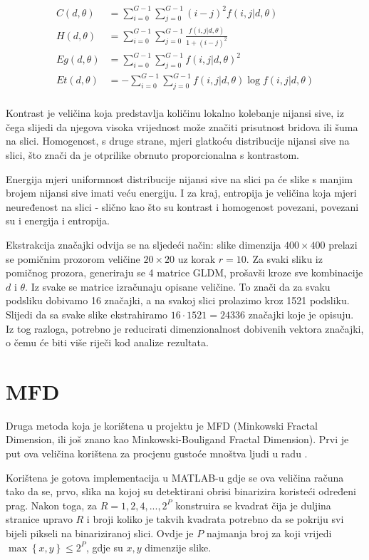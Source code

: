 \documentclass{report}
\begin{document}
\begin{align*}
C(d, \theta) &= \sum_{i=0}^{G-1}\sum_{j=0}^{G-1}(i-j)^2f(i,j|d, \theta)\\
H(d, \theta) &= \sum_{i=0}^{G-1}\sum_{j=0}^{G-1}\frac{f(i,j|d, \theta)}{1 + (i-j)^2}\\
Eg(d, \theta) &= \sum_{i=0}^{G-1}\sum_{j=0}^{G-1}f(i,j|d, \theta)^2\\
Et(d, \theta) &= -\sum_{i=0}^{G-1}\sum_{j=0}^{G-1}f(i,j|d, \theta)\log f(i, j |d, \theta)\\
\end{align*}

Kontrast je veličina koja predstavlja količinu lokalno kolebanje nijansi sive, iz čega slijedi da njegova visoka vrijednost može značiti prisutnost bridova ili šuma na slici. Homogenost, s druge strane, mjeri glatkoću distribucije nijansi sive na slici, što znači da je otprilike obrnuto proporcionalna s kontrastom.

Energija mjeri uniformnost distribucije nijansi sive na slici pa će slike s manjim brojem nijansi sive imati veću energiju. I za kraj, entropija je veličina koja mjeri neuređenost na slici - slično kao što su kontrast i homogenost povezani, povezani su i energija i entropija.

Ekstrakcija značajki odvija se na sljedeći način: slike dimenzija $400 \times 400$ prelazi se pomičnim prozorom veličine $20 \times 20$ uz korak $r = 10$. Za svaki sliku iz pomičnog prozora, generiraju se 4 matrice GLDM, prošavši kroze sve kombinacije $d$ i $\theta$. Iz svake se matrice izračunaju opisane veličine. To znači da za svaku podsliku dobivamo 16 značajki, a na svakoj slici prolazimo kroz 1521 podsliku. Slijedi da sa svake slike ekstrahiramo $16 \cdot 1521 = 24336$ značajki koje je opisuju. Iz tog razloga, potrebno je reducirati dimenzionalnost dobivenih vektora značajki, o čemu će biti više riječi kod analize rezultata.

\section{MFD}
Druga metoda koja je korištena u projektu je MFD (Minkowski Fractal Dimension, ili još znano kao Minkowski-Bouligand Fractal Dimension). Prvi je put ova veličina korištena za procjenu gustoće mnoštva ljudi u radu \cite{mfd}. 

Korištena je gotova implementacija u MATLAB-u gdje se ova veličina računa tako da se, prvo, slika na kojoj su detektirani obrisi binarizira koristeći određeni prag. Nakon toga, za $R = 1, 2, 4, ... , 2^P$ konstruira se kvadrat čija je duljina stranice upravo $R$ i broji koliko je takvih kvadrata potrebno da se pokriju svi bijeli pikseli na binariziranoj slici. Ovdje je $P$ najmanja broj za koji vrijedi $\max\left\lbrace x, y \right\rbrace \leq 2^P$, gdje su $x, y$ dimenzije slike.  
\end{document}
